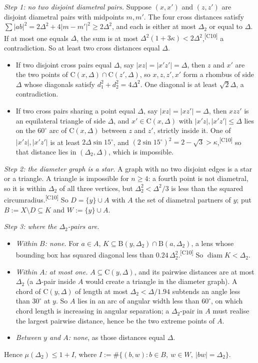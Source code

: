 \documentclass[11pt]{amsart}
\theoremstyle{definition}
\theoremstyle{remark}
\newcommand{\Dt}{\Delta_2}
\newcommand{\mult}{\mu}
\newcommand{\Cc}{\mathrm{C}}      %
\newcommand{\Dd}{\mathrm{B}}      %
\newcommand{\chk}[1]{\textsuperscript{[#1]}}
\begin{document}
\emph{Step 1: no two disjoint diametral pairs.} Suppose $(x,x')$ and $(z,z')$ are disjoint diametral pairs with midpoints $m,m'$. The four cross distances satisfy $\sum|ab|^2=2\Delta^2+4|m-m'|^2\ge2\Delta^2$, and each is either at most $\Dt$ or equal to $\Delta$. If at most one equals $\Delta$, the sum is at most $\Delta^2(1+3\kappa)<2\Delta^2$,\chk{C10} a contradiction. So at least two cross distances equal $\Delta$.
\begin{itemize}[leftmargin=2em]
\item If two disjoint cross pairs equal $\Delta$, say $|xz|=|x'z'|=\Delta$, then $z$ and $x'$ are the two points of $\Cc(x,\Delta)\cap\Cc(z',\Delta)$, so $x,z,z',x'$ form a rhombus of side $\Delta$ whose diagonals satisfy $d_1^2+d_2^2=4\Delta^2$. One diagonal is at least $\sqrt2\Delta$, a contradiction.
\item If two cross pairs sharing a point equal $\Delta$, say $|xz|=|xz'|=\Delta$, then $xzz'$ is an equilateral triangle of side $\Delta$, and $x'\in\Cc(x,\Delta)$ with $|x'z|,|x'z'|\le\Delta$ lies on the $60^\circ$ arc of $\Cc(x,\Delta)$ between $z$ and $z'$, strictly inside it. One of $|x'z|,|x'z'|$ is at least $2\Delta\sin15^\circ$, and $(2\sin15^\circ)^2=2-\sqrt3>\kappa$,\chk{C10} so that distance lies in $(\Dt,\Delta)$, which is impossible.
\end{itemize}

\emph{Step 2: the diameter graph is a star.} A graph with no two disjoint edges is a star or a triangle. A triangle is impossible for $n\ge4$: a fourth point is not diametral, so it is within $\Dt$ of all three vertices, but $\Dt^2<\Delta^2/3$ is less than the squared circumradius.\chk{C10} So $D=\{y\}\cup A$ with $A$ the set of diametral partners of $y$; put $B:=X\setminus D\subseteq K$ and $W:=\{y\}\cup A$.

\emph{Step 3: where the $\Dt$-pairs are.}
\begin{itemize}[leftmargin=2em]
\item \emph{Within $B$: none.} For $a\in A$, $K\subseteq\Dd(y,\Dt)\cap\Dd(a,\Dt)$, a lens whose bounding box has squared diagonal less than $0.24\,\Dt^2$.\chk{C10} So $\operatorname{diam}K<\Dt$.
\item \emph{Within $A$: at most one.} $A\subseteq\Cc(y,\Delta)$, and its pairwise distances are at most $\Dt$ (a $\Delta$-pair inside $A$ would create a triangle in the diameter graph). A chord of $\Cc(y,\Delta)$ of length at most $\Dt<\Delta/1.94$ subtends an angle less than $30^\circ$ at $y$. So $A$ lies in an arc of angular width less than $60^\circ$, on which chord length is increasing in angular separation; a $\Dt$-pair in $A$ must realise the largest pairwise distance, hence be the two extreme points of $A$.
\item \emph{Between $y$ and $A$: none}, as those distances equal $\Delta$.
\end{itemize}
Hence $\mult(\Dt)\le1+I$, where $I:=\#\{(b,w):b\in B,\ w\in W,\ |bw|=\Dt\}$.
\end{document}
